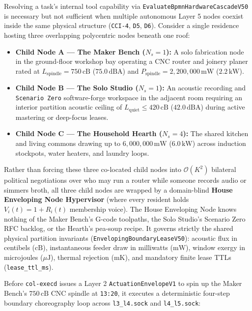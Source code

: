 Resolving a task's internal tool capability via \texttt{EvaluateBpmnHardwareCascadeV50} is necessary but not sufficient when multiple autonomous Layer 5 nodes coexist inside the same physical structure (\texttt{CCI-4}, \texttt{D5}, \texttt{D6}). Consider a single residence hosting three overlapping polycentric nodes beneath one roof:
\begin{itemize}
    \item \textbf{Child Node A --- The Maker Bench ($N_s = 1$):} A solo fabrication node in the ground-floor workshop bay operating a CNC router and joinery planer rated at $L_{\mathrm{spindle}} = 750\,\mathrm{cB}$ ($75.0\,\mathrm{dBA}$) and $P_{\mathrm{spindle}} = 2{,}200{,}000\,\mathrm{mW}$ ($2.2\,\mathrm{kW}$).
    \item \textbf{Child Node B --- The Solo Studio ($N_s = 1$):} An acoustic recording and \texttt{Scenario Zero} software-forge workspace in the adjacent room requiring an interior partition acoustic ceiling of $L_{\mathrm{quiet}} \le 420\,\mathrm{cB}$ ($42.0\,\mathrm{dBA}$) during active mastering or deep-focus leases.
    \item \textbf{Child Node C --- The Household Hearth ($N_s = 4$):} The shared kitchen and living commons drawing up to $6{,}000{,}000\,\mathrm{mW}$ ($6.0\,\mathrm{kW}$) across induction stockpots, water heaters, and laundry loops.
\end{itemize}

Rather than forcing these three co-located child nodes into $\mathcal{O}(K^2)$ bilateral political negotiations over who may run a router while someone records audio or simmers broth, all three child nodes are wrapped by a domain-blind \textbf{House Enveloping Node Hypervisor} (where every resident holds $V_i(t) = 1 + R_i(t)$ membership voice). The House Enveloping Node knows nothing of the Maker Bench's G-code toolpaths, the Solo Studio's Scenario Zero RFC backlog, or the Hearth's pea-soup recipe. It governs strictly the shared physical partition invariants (\texttt{EnvelopingBoundaryLeaseV50}): acoustic flux in centibels ($\mathrm{cB}$), instantaneous feeder draw in milliwatts ($\mathrm{mW}$), window exergy in microjoules ($\mu\mathrm{J}$), thermal rejection ($\mathrm{mK}$), and mandatory finite lease TTLs (\texttt{lease\_ttl\_ms}).

Before \texttt{col-execd} issues a Layer 2 \texttt{ActuationEnvelopeV1} to spin up the Maker Bench's $750\,\mathrm{cB}$ CNC spindle at \texttt{13:20}, it executes a deterministic four-step boundary choreography loop across \texttt{l3\_l4.sock} and \texttt{l4\_l5.sock}:

